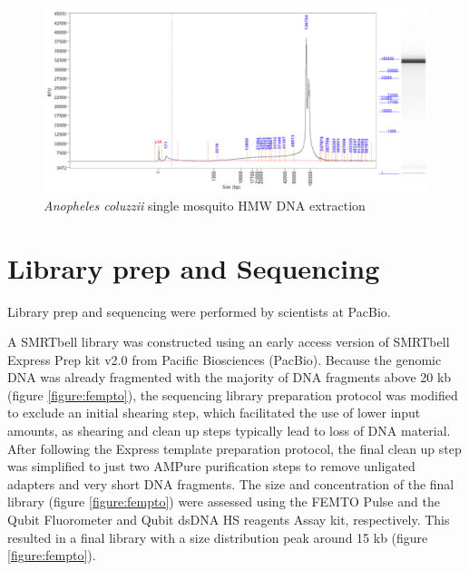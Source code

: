 \begin{figure}[htbp!]
\caption{\textit{Anopheles coluzzii} single mosquito HMW DNA extraction}
\label{figure:fempto2}
\begin{centering}
\includegraphics[width=.85\textwidth]{fempto2.png}
\end{centering}
\end{figure}

\section{Library prep and Sequencing}

Library prep and sequencing were performed by scientists at PacBio. \\

\par{
A SMRTbell library was constructed using an early access version of SMRTbell Express Prep kit v2.0 from Pacific Biosciences (PacBio). Because the genomic DNA was already fragmented with the majority of DNA fragments above 20 kb (figure \ref{figure:fempto}), the sequencing library preparation protocol was modified to exclude an initial shearing step, which facilitated the use of lower input amounts, as shearing and clean up steps typically lead to loss of DNA material. After following the Express template preparation protocol, the final clean up step was simplified to just two AMPure purification steps to remove unligated adapters and very short DNA fragments. The size and concentration of the final library (figure  \ref{figure:fempto}) were assessed using the FEMTO Pulse and the Qubit Fluorometer and Qubit dsDNA HS reagents Assay kit, respectively. This resulted in a final library with a size distribution peak around 15 kb (figure \ref{figure:fempto}). 
}


